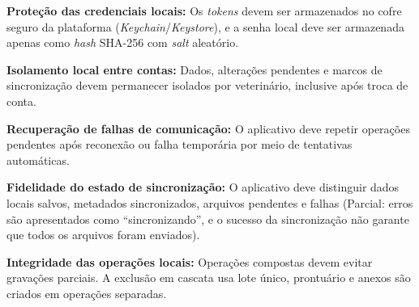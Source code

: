 \begin{description}[leftmargin=2.1cm, labelwidth=1.8cm, itemsep=0.5em]
    \item[RNF11] \textbf{Proteção das credenciais locais:} Os \textit{tokens} devem ser armazenados no cofre seguro da plataforma (\textit{Keychain}/\textit{Keystore}), e a senha local deve ser armazenada apenas como \textit{hash} SHA-256 com \textit{salt} aleatório.
    \item[RNF12] \textbf{Isolamento local entre contas:} Dados, alterações pendentes e marcos de sincronização devem permanecer isolados por veterinário, inclusive após troca de conta.
    \item[RNF13] \textbf{Recuperação de falhas de comunicação:} O aplicativo deve repetir operações pendentes após reconexão ou falha temporária por meio de tentativas automáticas.
    \item[RNF14] \textbf{Fidelidade do estado de sincronização:} O aplicativo deve distinguir dados locais salvos, metadados sincronizados, arquivos pendentes e falhas (Parcial: erros são apresentados como “sincronizando”, e o sucesso da sincronização não garante que todos os arquivos foram enviados).
    \item[RNF15] \textbf{Integridade das operações locais:} Operações compostas devem evitar gravações parciais. A exclusão em cascata usa lote único, prontuário e anexos são criados em operações separadas.
\end{description}
